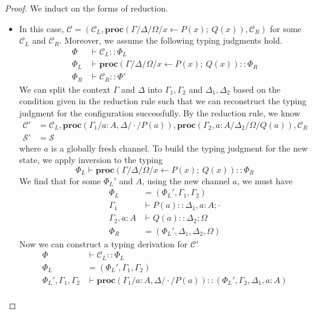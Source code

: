 \documentclass[12pt, openany]{memoir}
\newcommand*{\spawn}[3]{#3 \leftarrow #1(#3);\ #2(#3)}
\newcommand*{\procObj}[4]{\textbf{proc}(#1/#2/#3/#4)}
\newcommand*{\config}[0]{\mathcal{C}}
\newcommand*{\cancelSet}[0]{\mathcal{S}}
\begin{document}
\begin{proof}
  We induct on the forms of reduction.
  \begin{itemize}
    \item [\stepref{spawn}{spawn}] In this case, $\config = (\config_L, \procObj{\Gamma}{\Delta}{\Omega}{\spawn{P}{Q}{x}}, \config_R)$ for some $\config_L$ and $\config_R$. 
    Moreover, we assume the following typing judgments hold.
    \begin{align*}
      \Phi & \vdash \config_L :: \Phi_L \\
      \Phi_L & \vdash \procObj{\Gamma}{\Delta}{\Omega}{\spawn{P}{Q}{x}} :: \Phi_R\\
      \Phi_R & \vdash \config_R :: \Phi'
    \end{align*}
    We can split the context $\Gamma$ and $\Delta$ into $\Gamma_1, \Gamma_2$ and $\Delta_1, \Delta_2$ based on the condition given in the reduction rule
    such that we can reconstruct the typing judgment for the configuration successfully.
    By the reduction rule, we know
    \begin{align*}
      \config' &= \config_L, \procObj{\Gamma_1}{a : A, \Delta}{\cdot}{P(a)}, \procObj{\Gamma_2, a : A}{\Delta_2}{\Omega}{Q(a)}, \config_R \\
      \cancelSet' &= \cancelSet
    \end{align*}
    where $a$ is a globally fresh channel.
    To build the typing judgment for the new state, we apply inversion to the typing 
    \[
      \Phi_L \vdash \procObj{\Gamma}{\Delta}{\Omega}{\spawn{P}{Q}{x}} :: \Phi_R
    \]
    We find that for some $\Phi_L'$ and $A$, using the new channel $a$, we must have
    \begin{align*}
      \Phi_L &= (\Phi_L', \Gamma_1, \Gamma_2) \\
      \Gamma_1 & \vdash P(a) :: \Delta_1, a : A; \cdot \\
      \Gamma_2, a : A & \vdash Q(a) :: \Delta_2; \Omega \\
      \Phi_R &= (\Phi_L', \Delta_1, \Delta_2, \Omega)
    \end{align*}
    Now we can construct a typing derivation for $\config'$
    \begin{align*}
      \Phi & \vdash \config_L :: \Phi_L \\
      \Phi_L &= (\Phi_L', \Gamma_1, \Gamma_2) \\
      \Phi_L', \Gamma_1, \Gamma_2 & \vdash \procObj{\Gamma_1}{a : A, \Delta}{\cdot}{P(a)} :: (\Phi_L', \Gamma_2, \Delta_1, a : A) \\

\end{align*}
\end{itemize}
\end{proof}
\end{document}
